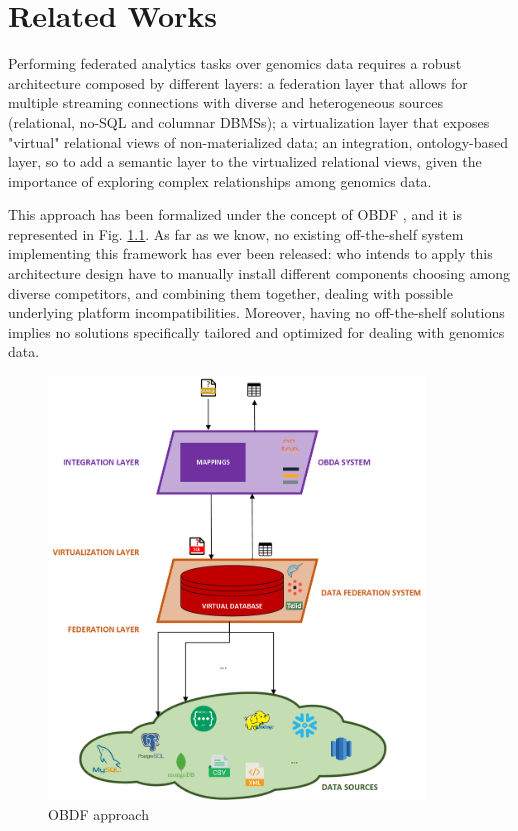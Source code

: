
\chapter{Related Works}
\label{chp:related}

Performing federated analytics tasks over genomics data requires a robust architecture composed by different layers: a federation layer that allows for multiple streaming connections with diverse and heterogeneous sources (relational, no-SQL and columnar \ac{DBMS}s); a virtualization layer that exposes "virtual" relational views of non-materialized data; an integration, ontology-based layer, so to add a semantic layer to the virtualized relational views, given the importance of exploring complex relationships among genomics data.

This approach has been formalized under the concept of \ac{OBDF} \cite{DBLP:conf/icde/GuCPLMX24}, and it is represented in Fig. \ref{fig:obdf}. As far as we know, no existing off-the-shelf system implementing this framework has ever been released: who intends to apply this architecture design have to manually install different components choosing among diverse competitors, and combining them together, dealing with possible underlying platform incompatibilities. Moreover, having no off-the-shelf solutions implies no solutions specifically tailored and optimized for dealing with genomics data.

\begin{figure}[ht]
    \centering
    \includegraphics[width=10cm]{res/Drawing4.png}
    \caption{OBDF approach}
    \label{fig:obdf}
\end{figure}

